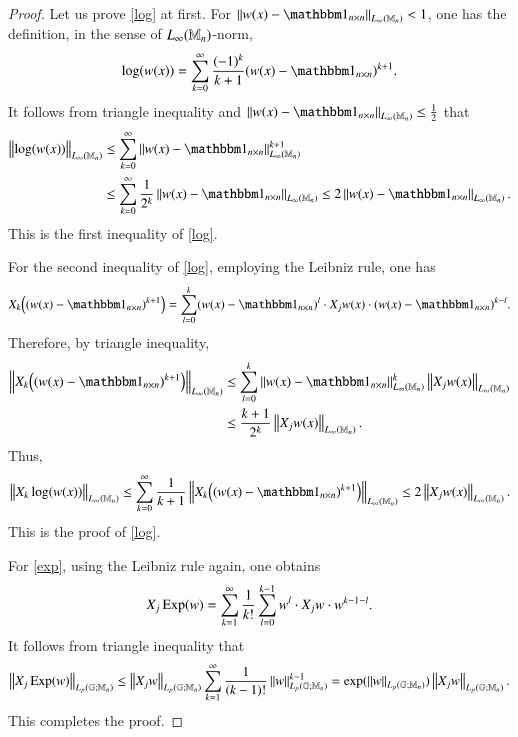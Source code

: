 \documentclass[leqno]{amsart}
\begin{document}
	\begin{proof}
		Let us prove \eqref{log} at first. For $\Norm{w(x)-\unit_{n\times n}}_{\lm{n}}<1$, one has the definition, in the sense of $L_{\infty}(\mathbb{M}_{n})$-norm,
		\begin{align*}
			\log(w(x))=\sum_{k=0}^{\infty}\frac{(-1)^{k}}{k+1}(w(x)-\unit_{n\times n})^{k+1}.
		\end{align*}
		It follows from triangle inequality and $\Norm{w(x)-\unit_{n\times n}}_{\lm{n}}\leq\frac{1}{2}$ that
		\begin{align*}
			\Norm{\log(w(x))}_{\lm{n}}
			&\leq\sum_{k=0}^{\infty}\Norm{w(x)-\unit_{n\times n}}_{\lm{n}}^{k+1}\\
			&\leq\sum_{k=0}^{\infty}\frac{1}{2^{k}}\Norm{w(x)-\unit_{n\times n}}_{\lm{n}}
			\leq2\Norm{w(x)-\unit_{n\times n}}_{\lm{n}}.
		\end{align*}
		This is the first inequality of \eqref{log}. 
		
		For the second inequality of \eqref{log}, employing the Leibniz rule, one has
		\begin{align*}
			X_{k}\Big((w(x)-\unit_{n\times n})^{k+1}\Big)
			=\sum_{l=0}^{k}(w(x)-\unit_{n\times n})^{l}\cdot X_{j}w(x)\cdot (w(x)-\unit_{n\times n})^{k-l}.
		\end{align*}
		Therefore, by triangle inequality,
		\begin{align*}
			\Norm{X_{k}\Big((w(x)-\unit_{n\times n})^{k+1}\Big)}_{\lm{n}}
			&\leq\sum_{l=0}^{k}\Norm{w(x)-\unit_{n\times n}}_{\lm{n}}^{k} \Norm{X_{j}w(x)}_{\lm{n}}\\
			&\leq\frac{k+1}{2^{k}}\Norm{X_{j}w(x)}_{\lm{n}}.
		\end{align*}
		Thus,
		\begin{align*}
			\Norm{X_{k}\log(w(x))}_{\lm{n}}
			\leq\sum_{k=0}^{\infty}\frac{1}{k+1}\Norm{X_{k}\Big((w(x)-\unit_{n\times n})^{k+1}\Big)}_{\lm{n}}
			\leq2\Norm{X_{j}w(x)}_{\lm{n}}.
		\end{align*}
		This is the proof of \eqref{log}.
		
		For \eqref{exp}, using the Leibniz rule again, one obtains
		\begin{align*}
			X_{j}\operatorname{\rm Exp}(w)=\sum_{k=1}^{\infty}\frac{1}{k!}\sum_{l=0}^{k-1}w^{l}\cdot X_{j}w\cdot w^{k-1-l}.
		\end{align*}
		It follows from triangle inequality that
		\begin{align*}
			\left\| X_{j}\operatorname{\rm Exp}(w) \right\|_{L_{p}(\mathbb{G};\mathbb{M}_{n})}
			\leq\left\| X_{j}w \right\|_{L_{p}(\mathbb{G};\mathbb{M}_{n})}\sum_{k=1}^{\infty}\frac{1}{(k-1)!}\left\| w \right\|_{L_{p}(\mathbb{G};\mathbb{M}_{n})}^{k-1}
			=\exp(\left\| w \right\|_{L_{p}(\mathbb{G};\mathbb{M}_{n})})\left\| X_{j}w \right\|_{L_{p}(\mathbb{G};\mathbb{M}_{n})}.
		\end{align*}
		This completes the proof.
	\end{proof}
	
\end{document}
